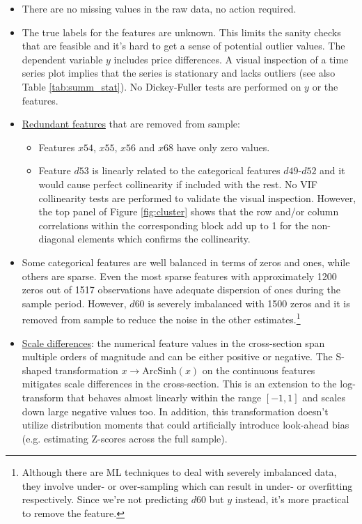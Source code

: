 \documentclass[12pt]{article}
\begin{document}
\begin{itemize}
	\item There are no missing values in the raw data, no action required.
	\item The true labels for the features are unknown. This limits the sanity checks that are feasible and it's hard to get a sense of potential outlier values. The dependent variable $y$ includes price differences. A visual inspection of a time series plot implies that the series is stationary and lacks outliers (see also Table \ref{tab:summ_stat}). No Dickey-Fuller tests are performed on $y$ or the features.
	\item \underline{Redundant features} that are removed from sample:
	\begin{itemize}
		\item Features $x54$, $x55$, $x56$ and $x68$ have only zero values.
		\item Feature $d53$ is linearly related to the categorical features $d49$-$d52$ and it would cause perfect collinearity if included with the rest. No VIF collinearity tests are performed to validate the visual inspection. However, the top panel of Figure \ref{fig:cluster} shows that the row and/or column correlations within the corresponding block add up to 1 for the non-diagonal elements which confirms the collinearity.
	\end{itemize}
	\item Some categorical features are well balanced in terms of zeros and ones, while others are sparse. Even the most sparse features with approximately 1200 zeros out of 1517 observations have adequate dispersion of ones during the sample period. However, $d60$ is severely imbalanced with 1500 zeros and it is removed from sample to reduce the noise in the other estimates.\footnote{Although there are ML techniques to deal with severely imbalanced data, they involve under- or over-sampling which can result in under- or overfitting respectively. Since we're not predicting $d60$ but $y$ instead, it's more practical to remove the feature.}
	\item \underline{Scale differences}: the numerical feature values in the cross-section span multiple orders of magnitude and can be either positive or negative. The S-shaped transformation $x\rightarrow\mathrm{ArcSinh}(x)$ on the continuous features mitigates scale differences in the cross-section. This is an extension to the log-transform that behaves almost linearly within the range $[-1,1]$ and scales down large negative values too. In addition, this transformation doesn't utilize distribution moments that could artificially introduce look-ahead bias (e.g. estimating Z-scores across the full sample).

\end{itemize}
\end{document}
